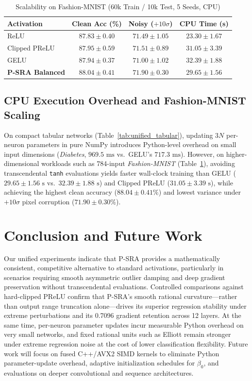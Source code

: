 \documentclass[conference]{IEEEtran}
\begin{document}
\begin{table}[t]
\centering
\footnotesize
\setlength{\tabcolsep}{3.5pt}
\caption{Scalability on Fashion-MNIST (60k Train / 10k Test, 5 Seeds, CPU)}
\label{tab:fmnist}
\begin{tabular}{lccc}
\toprule
\textbf{Activation} & \textbf{Clean Acc (\%)} & \textbf{Noisy ($+10\sigma$)} & \textbf{CPU Time (s)} \\
\midrule
ReLU & $87.83 \pm 0.40$ & $71.49 \pm 1.05$ & $\mathbf{23.30 \pm 1.67}$ \\
Clipped PReLU & $87.95 \pm 0.59$ & $71.51 \pm 0.89$ & $31.05 \pm 3.39$ \\
GELU & $87.94 \pm 0.37$ & $71.00 \pm 1.02$ & $32.39 \pm 1.88$ \\
\textbf{P-SRA Balanced} & $\mathbf{88.04 \pm 0.41}$ & $\mathbf{71.90 \pm 0.30}$ & $29.65 \pm 1.56$ \\
\bottomrule
\end{tabular}
\end{table}

\subsection{CPU Execution Overhead and Fashion-MNIST Scaling}
On compact tabular networks (Table~\ref{tab:unified_tabular}), updating $3N$ per-neuron parameters in pure NumPy introduces Python-level overhead on small input dimensions (\textit{Diabetes}, $969.5\text{ ms}$ vs.\ GELU's $717.3\text{ ms}$). However, on higher-dimensional workloads such as 784-input \textit{Fashion-MNIST} (Table~\ref{tab:fmnist}), avoiding transcendental \texttt{tanh} evaluations yields faster wall-clock training than GELU ($29.65 \pm 1.56\text{ s}$ vs.\ $32.39 \pm 1.88\text{ s}$) and Clipped PReLU ($31.05 \pm 3.39\text{ s}$), while achieving the highest clean accuracy ($\mathbf{88.04 \pm 0.41\%}$) and lowest variance under $+10\sigma$ pixel corruption ($\mathbf{71.90 \pm 0.30\%}$).

\section{Conclusion and Future Work}
Our unified experiments indicate that P-SRA provides a mathematically consistent, competitive alternative to standard activations, particularly in scenarios requiring smooth asymmetric outlier damping and deep gradient preservation without transcendental evaluations. Controlled comparisons against hard-clipped PReLU confirm that P-SRA's smooth rational curvature—rather than output range truncation alone—drives its superior regression stability under extreme perturbations and its 0.7096 gradient retention across 12 layers. At the same time, per-neuron parameter updates incur measurable Python overhead on very small networks, and fixed rational units such as Elliott remain stronger under extreme regression noise at the cost of lower classification flexibility. Future work will focus on fused C++/AVX2 SIMD kernels to eliminate Python parameter-update overhead, adaptive initialization schedules for $\beta_0$, and evaluations on deeper convolutional and sequence architectures.
\end{document}
